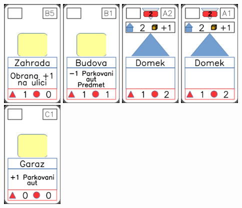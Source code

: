 \documentclass[a4paper]{article}
\begin{document}
	\includegraphics[width=3.0cm]{img-2_24}
	\includegraphics[width=3.0cm]{img-2_5}
	\includegraphics[width=3.0cm]{img-3_1}
	\includegraphics[width=3.0cm]{img-3_0}
	\includegraphics[width=3.0cm]{img-2_10}
\end{document}
